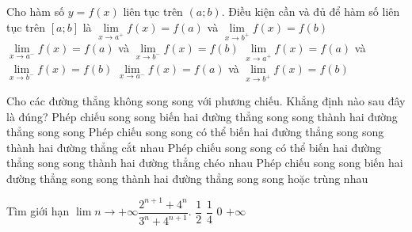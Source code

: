 \begin{ex}%
	Cho hàm số $y=f\left(x\right)$ liên tục trên $(a;b)$. Điều kiện cần và đủ để hàm số liên tục trên $\left[a; b\right]$ là
	\choice
	{${\mathop{\lim}\limits_{x\to a^{+}}} f\left(x\right)=f\left(a\right)$ và ${\mathop{\lim}\limits_{x\to b^{+}}} f\left(x\right)=f\left(b\right)$}
	{${\mathop{\lim}\limits_{x\to a^{-}}} f\left(x\right)=f\left(a\right)$ và ${\mathop{\lim}\limits_{x\to b^{-}}} f\left(x\right)=f\left(b\right)$}
	{\True ${\mathop{\lim}\limits_{x\to a^{+}}} f\left(x\right)=f\left(a\right)$ và ${\mathop{\lim}\limits_{x\to b^{-}}} f\left(x\right)=f\left(b\right)$}
	{${\mathop{\lim}\limits_{x\to a^{-}}} f\left(x\right)=f\left(a\right)$ và ${\mathop{\lim}\limits_{x\to b^{+}}} f\left(x\right)=f\left(b\right)$}
\end{ex}

\begin{ex}%
	Cho các đường thẳng không song song với phương chiếu. Khẳng định nào sau đây là đúng?
	\choice
	{Phép chiếu song song biến hai đường thẳng song song thành hai đường thẳng song song}
	{Phép chiếu song song có thể biến hai đường thẳng song song thành hai đường thẳng cắt nhau}
	{Phép chiếu song song có thể biến hai đường thẳng song song thành hai đường thẳng chéo nhau}
	{\True Phép chiếu song song biến hai đường thẳng song song thành hai đường thẳng song song hoặc trùng nhau}
\end{ex}

\begin{ex}%
	Tìm giới hạn $\lim \limits{n \to +\infty}\dfrac{2^{n+1}+4^n}{3^n+4^{n+1}}$.
	\choice
	{$\dfrac{1}{2}$}
	{\True $\dfrac{1}{4}$}
	{$0$}
	{$+\infty$}
\end{ex}

